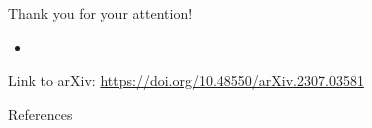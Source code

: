 \documentclass[11pt, aspectratio=169]{beamer}
\begin{document}

\begin{frame}
  Thank you for your attention!
  \begin{itemize}
    \item[]
  \end{itemize}
  Link to arXiv: \url{https://doi.org/10.48550/arXiv.2307.03581}
\end{frame}


\begin{frame}[allowframebreaks]{References}
  \printbibliography
\end{frame}
\end{document}
